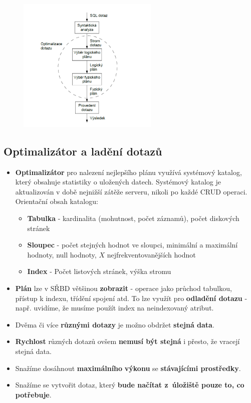 \begin{figure}[H]
	\centering
	\includegraphics[width=0.6\textwidth]{assets/zpracovani_dotazu.png}
\end{figure}

\subsection{Optimalizátor a ladění dotazů}
\begin{itemize}
	\item \textbf{Optimalizátor} pro nalezení nejlepšího plánu využívá systémový katalog, který obsahuje statistiky o uložených datech. Systémový katalog je aktualizován v době nejnižší zátěže serveru, nikoli po každé CRUD operaci. Orientační obsah katalogu:
	\begin{itemize}
		\item \textbf{Tabulka} - kardinalita (mohutnost, počet záznamů), počet diskových stránek
		\item \textbf{Sloupec} - počet stejných hodnot ve sloupci, minimální a maximální hodnoty, null hodnoty, $X$ nejfrekventovanějších hodnot
		\item \textbf{Index} - Počet listových stránek, výška stromu
	\end{itemize}
	\item \textbf{Plán} lze v SŘBD většinou \textbf{zobrazit} - operace jako průchod tabulkou, přístup k indexu, třídění spojení atd. To lze využít pro \textbf{odladění dotazu} - např. uvidíme, že musíme použít index na neindexovaný atribut.
	\item Dvěma či více \textbf{různými dotazy} je možno obdržet \textbf{stejná data}. 
	\item \textbf{Rychlost} různých dotazů ovšem\textbf{ nemusí být stejná }i přesto, že vracejí stejná data.
	\item Snažíme dosáhnout \textbf{maximálního} \textbf{výkonu} se \textbf{stávajícími prostředky}.
	\item Snažíme se vytvořit dotaz, který\textbf{ bude načítat z úložiště pouze to, co potřebuje}.
\end{itemize}


